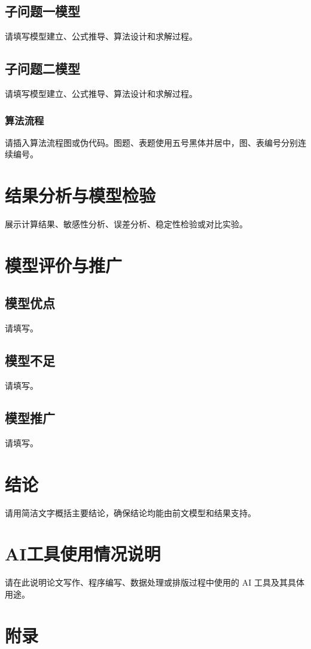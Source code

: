 \documentclass[withoutpreface,bwprint]{cumcmthesis}
\begin{document}
\subsection{子问题一模型}
请填写模型建立、公式推导、算法设计和求解过程。

\subsection{子问题二模型}
请填写模型建立、公式推导、算法设计和求解过程。

\subsubsection{算法流程}
请插入算法流程图或伪代码。图题、表题使用五号黑体并居中，图、表编号分别连续编号。

\section{结果分析与模型检验}
展示计算结果、敏感性分析、误差分析、稳定性检验或对比实验。

\section{模型评价与推广}
\subsection{模型优点}
请填写。
\subsection{模型不足}
请填写。
\subsection{模型推广}
请填写。

\section{结论}
请用简洁文字概括主要结论，确保结论均能由前文模型和结果支持。

\section*{AI工具使用情况说明}
请在此说明论文写作、程序编写、数据处理或排版过程中使用的 AI 工具及其具体用途。



\clearpage
\section*{附录}
\end{document}
